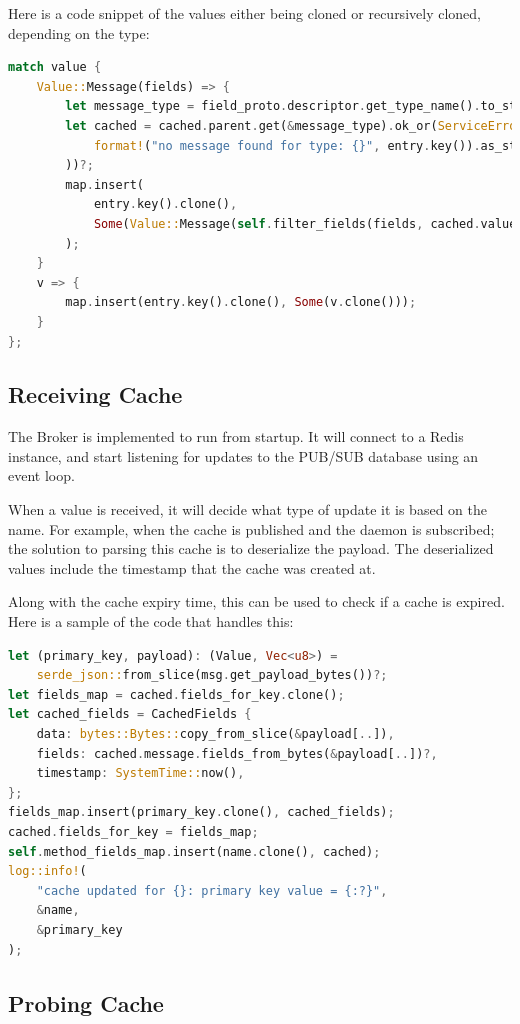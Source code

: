 \documentclass[a4paper,12pt]{report}
\begin{document}
Here is a code snippet of the values either being cloned or recursively cloned, depending on the type:

\begin{lstlisting}[language=Rust]
match value {
    Value::Message(fields) => {
        let message_type = field_proto.descriptor.get_type_name().to_string();
        let cached = cached.parent.get(&message_type).ok_or(ServiceError::new(
            format!("no message found for type: {}", entry.key()).as_str(),
        ))?;
        map.insert(
            entry.key().clone(),
            Some(Value::Message(self.filter_fields(fields, cached.value())?)),
        );
    }
    v => {
        map.insert(entry.key().clone(), Some(v.clone()));
    }
};
\end{lstlisting}

\subsection{Receiving Cache}
The Broker is implemented to run from startup. It will connect to a Redis instance, and start listening for updates to the PUB/SUB database using an event loop.

When a value is received, it will decide what type of update it is based on the name. For example, when the cache is published and the daemon is subscribed; the solution to parsing this cache is to deserialize the payload. The deserialized values include the timestamp that the cache was created at. 

Along with the cache expiry time, this can be used to check if a cache is expired. Here is a sample of the code that handles this:

\begin{lstlisting}[language=Rust]
let (primary_key, payload): (Value, Vec<u8>) =
    serde_json::from_slice(msg.get_payload_bytes())?;
let fields_map = cached.fields_for_key.clone();
let cached_fields = CachedFields {
    data: bytes::Bytes::copy_from_slice(&payload[..]),
    fields: cached.message.fields_from_bytes(&payload[..])?,
    timestamp: SystemTime::now(),
};
fields_map.insert(primary_key.clone(), cached_fields);
cached.fields_for_key = fields_map;
self.method_fields_map.insert(name.clone(), cached);
log::info!(
    "cache updated for {}: primary key value = {:?}",
    &name,
    &primary_key
);
\end{lstlisting}

\subsection{Probing Cache}
\end{document}
